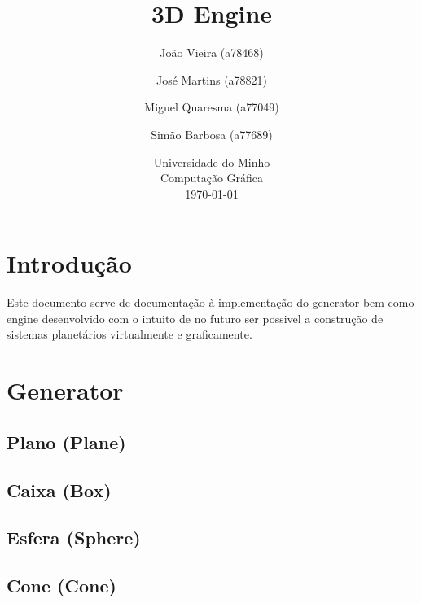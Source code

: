 \documentclass{article}
\begin{document}
\title{\vspace*{\fill}3D Engine}
\author{João Vieira (a78468) \and José Martins (a78821) \and Miguel Quaresma (a77049) \and Simão Barbosa (a77689)}
\date{%
    Universidade do Minho\\
    Computação Gráfica\\[2ex]%
    \today\vspace*{\fill}
}
\maketitle

\newpage

\tableofcontents

\newpage

\section{Introdução}
Este documento serve de documentação à implementação do generator bem como engine desenvolvido com o intuito de no futuro ser possivel a construção de sistemas planetários virtualmente e graficamente.

\section{Generator}

\subsection{Plano (Plane)}

\subsection{Caixa (Box)}

\subsection{Esfera (Sphere)}

\subsection{Cone (Cone)}
\end{document}
